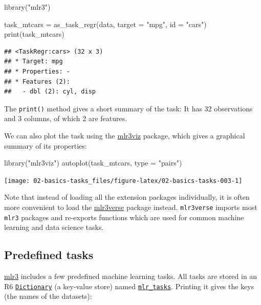 \documentclass[
]{scrbook}
\newenvironment{Shaded}{\begin{snugshade}}{\end{snugshade}}
\newcommand{\AttributeTok}[1]{\textcolor[rgb]{0.77,0.63,0.00}{#1}}
\newcommand{\FunctionTok}[1]{\textcolor[rgb]{0.00,0.00,0.00}{#1}}
\newcommand{\NormalTok}[1]{#1}
\newcommand{\OtherTok}[1]{\textcolor[rgb]{0.56,0.35,0.01}{#1}}
\newcommand{\StringTok}[1]{\textcolor[rgb]{0.31,0.60,0.02}{#1}}
\renewenvironment{Shaded} {\begin{snugshade}\small} {\end{snugshade}}
\begin{document}
\begin{Shaded}
\begin{Highlighting}[]
\FunctionTok{library}\NormalTok{(}\StringTok{"mlr3"}\NormalTok{)}

\NormalTok{task\_mtcars }\OtherTok{=} \FunctionTok{as\_task\_regr}\NormalTok{(data, }\AttributeTok{target =} \StringTok{"mpg"}\NormalTok{, }\AttributeTok{id =} \StringTok{"cars"}\NormalTok{)}
\FunctionTok{print}\NormalTok{(task\_mtcars)}
\end{Highlighting}
\end{Shaded}

\begin{verbatim}
## <TaskRegr:cars> (32 x 3)
## * Target: mpg
## * Properties: -
## * Features (2):
##   - dbl (2): cyl, disp
\end{verbatim}

The \texttt{print()} method gives a short summary of the task:
It has 32 observations and 3 columns, of which 2 are features.

We can also plot the task using the \href{https://mlr3viz.mlr-org.com}{mlr3viz} package, which gives a graphical summary of its properties:

\begin{Shaded}
\begin{Highlighting}[]
\FunctionTok{library}\NormalTok{(}\StringTok{"mlr3viz"}\NormalTok{)}
\FunctionTok{autoplot}\NormalTok{(task\_mtcars, }\AttributeTok{type =} \StringTok{"pairs"}\NormalTok{)}
\end{Highlighting}
\end{Shaded}

\begin{center}\texttt{[image: 02-basics-tasks\_files/figure-latex/02-basics-tasks-003-1]} \end{center}

Note that instead of loading all the extension packages individually, it is often more convenient to load the \href{https://mlr3verse.mlr-org.com}{mlr3verse} package instead.
\texttt{mlr3verse} imports most \texttt{mlr3} packages and re-exports functions which are used for common machine learning and data science tasks.

\hypertarget{tasks-predefined}{%
\subsection{Predefined tasks}\label{tasks-predefined}}

\href{https://mlr3.mlr-org.com}{mlr3} includes a few predefined machine learning tasks.
All tasks are stored in an R6 \href{https://mlr3misc.mlr-org.com/reference/Dictionary.html}{\texttt{Dictionary}} (a key-value store) named \href{https://mlr3.mlr-org.com/reference/mlr_tasks.html}{\texttt{mlr\_tasks}}.
Printing it gives the keys (the names of the datasets):
\end{document}

